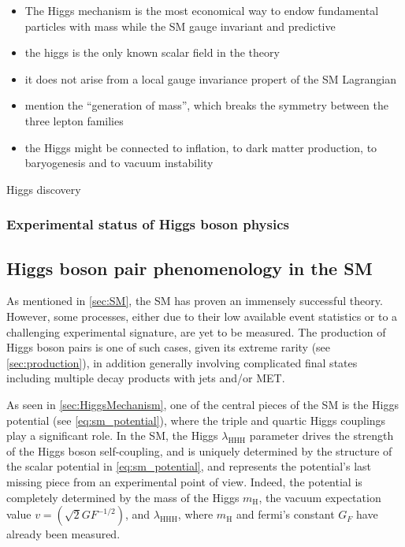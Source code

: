\documentclass[11pt]{article}
\newcommand{\klthree}{\lambda_{\text{HHH}}}
\newcommand{\mh}{m_{\text{H}}}
\begin{document}
\begin{itemize}
\item The Higgs mechanism is the most economical way to endow fundamental particles with mass while  the SM gauge invariant and predictive
\item the higgs is the only known scalar field in the theory
\item it does not arise from a local gauge invariance propert of the SM Lagrangian
\item mention the ``generation of mass'', which breaks the symmetry between the three lepton families
\item the Higgs might be connected to inflation, to dark matter production, to baryogenesis and to vacuum instability
\end{itemize}


Higgs discovery \cite{CMS_Higgs_discovery1,CMS_Higgs_discovery2,ATLAS_Higgs_discovery}
\subsubsection{Experimental status of Higgs boson physics}
\label{sec:org6b6444c}
\subsection{Higgs boson pair phenomenology in the SM}
\label{sec:org60fc133}
\label{sec:dihiggs}

As mentioned in \cref{sec:SM}, the \ac{SM} has proven an immensely successful theory.
However, some processes, either due to their low available event statistics or to a challenging experimental signature, are yet to be measured.
The production of Higgs boson pairs is one of such cases, given its extreme rarity (see \cref{sec:production}), in addition generally involving complicated final states including multiple decay products with jets and/or \ac{MET}.

As seen in \cref{sec:HiggsMechanism}, one of the central pieces of the SM is the Higgs potential (see \cref{eq:sm_potential}), where the triple and quartic Higgs couplings play a significant role.
In the \ac{SM}, the Higgs \(\klthree\) parameter drives the strength of the Higgs boson self-coupling, and is uniquely determined by the structure of the scalar potential in \cref{eq:sm_potential}, and represents the potential's last missing piece from an experimental point of view.
Indeed, the potential is completely determined by the mass of the Higgs \(\mh\), the vacuum expectation value \(v=(\sqrt{2}G{F}^{-1/2})\), and \(\klthree\), where \(\mh\) and fermi's constant \(G_{F}\) have already been measured.
\end{document}
